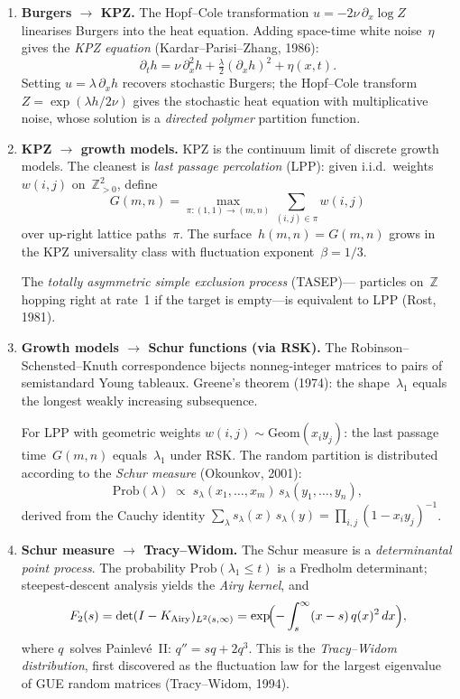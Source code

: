 \documentclass[11pt]{article}
\newcommand{\Z}{\mathbb{Z}}
\theoremstyle{plain}
\theoremstyle{definition}
\theoremstyle{remark}
\begin{document}
\begin{enumerate}[label=\textbf{Step \arabic*.}, leftmargin=2.5em]

\item \textbf{Burgers $\to$ KPZ.}
The Hopf--Cole transformation $u = -2\nu\,\partial_x\log Z$
linearises Burgers into the heat equation. Adding space-time white
noise~$\eta$ gives the \emph{KPZ equation}
(Kardar--Parisi--Zhang, 1986):
\[
  \partial_t h = \nu\,\partial_x^2 h
    + \tfrac{\lambda}{2}(\partial_x h)^2 + \eta(x,t).
\]
Setting $u=\lambda\,\partial_x h$ recovers stochastic Burgers; the
Hopf--Cole transform $Z=\exp(\lambda h/2\nu)$ gives the stochastic
heat equation with multiplicative noise, whose solution is a
\emph{directed polymer} partition function.

\item \textbf{KPZ $\to$ growth models.}
KPZ is the continuum limit of discrete growth models. The cleanest
is \emph{last passage percolation} (LPP): given i.i.d.\ weights
$w(i,j)$ on~$\Z_{>0}^2$, define
\[
  G(m,n) = \max_{\pi:(1,1)\to(m,n)}
    \sum_{(i,j)\in\pi} w(i,j)
\]
over up-right lattice paths~$\pi$. The surface~$h(m,n)=G(m,n)$
grows in the KPZ universality class with fluctuation
exponent~$\beta=1/3$.

The \emph{totally asymmetric simple exclusion process} (TASEP)---
particles on~$\Z$ hopping right at rate~1 if the target is
empty---is equivalent to LPP (Rost, 1981).

\item \textbf{Growth models $\to$ Schur functions (via RSK).}
The Robinson--Schensted--Knuth correspondence bijects
nonneg-integer matrices to pairs of semistandard Young tableaux.
Greene's theorem (1974): the shape~$\lambda_1$ equals the longest
weakly increasing subsequence.

For LPP with geometric weights $w(i,j)\sim\mathrm{Geom}(x_i y_j)$:
the last passage time~$G(m,n)$ equals~$\lambda_1$ under RSK.
The random partition is distributed according to the \emph{Schur
measure} (Okounkov, 2001):
\[
  \mathrm{Prob}(\lambda) \;\propto\;
    s_\lambda(x_1,\ldots,x_m)\,s_\lambda(y_1,\ldots,y_n),
\]
derived from the Cauchy identity
$\sum_\lambda s_\lambda(x)\,s_\lambda(y) =
  \prod_{i,j}(1-x_iy_j)^{-1}$.

\item \textbf{Schur measure $\to$ Tracy--Widom.}
The Schur measure is a \emph{determinantal point process}. The
probability $\mathrm{Prob}(\lambda_1\le t)$ is a Fredholm
determinant; steepest-descent analysis yields the \emph{Airy
kernel}, and
\[
  F_2(s) = \det(I-K_{\mathrm{Airy}})_{L^2(s,\infty)}
         = \exp\!\Bigl(-\int_s^\infty (x-s)\,q(x)^2\,dx\Bigr),
\]
where $q$~solves Painlev\'e~II: $q''=sq+2q^3$. This is the
\emph{Tracy--Widom distribution}, first discovered as the
fluctuation law for the largest eigenvalue of GUE random
matrices (Tracy--Widom, 1994).

\end{enumerate}
\end{document}
